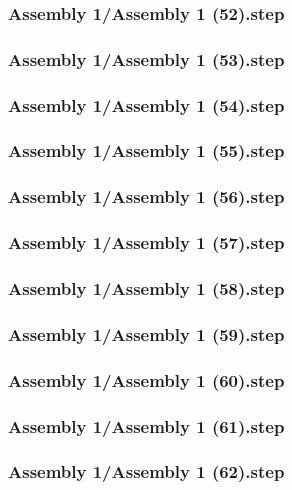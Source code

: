 \documentclass[a4paper,12pt]{article}
\begin{document}
\subsubsection{Assembly 1/Assembly 1 (52).step}

\subsubsection{Assembly 1/Assembly 1 (53).step}

\subsubsection{Assembly 1/Assembly 1 (54).step}

\subsubsection{Assembly 1/Assembly 1 (55).step}

\subsubsection{Assembly 1/Assembly 1 (56).step}

\subsubsection{Assembly 1/Assembly 1 (57).step}

\subsubsection{Assembly 1/Assembly 1 (58).step}

\subsubsection{Assembly 1/Assembly 1 (59).step}

\subsubsection{Assembly 1/Assembly 1 (60).step}

\subsubsection{Assembly 1/Assembly 1 (61).step}

\subsubsection{Assembly 1/Assembly 1 (62).step}

\end{document}
